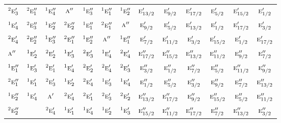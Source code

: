 \documentclass[10pt,a4paper]{article}
\numberwithin{equation}{section}
\newcommand{\irr}[1]{\text{\normalfont\scshape #1}}
\newcommand{\conjpair}[1]{{}^{#1}}
\begin{document}
{\begin{longtable}{@{}lcccccccccccc@{}}
$\conjpair{2}\irr{e}_{3}'$ & $\conjpair{2}\irr{e}_{1}''$ & $\conjpair{1}\irr{e}_{4}''$ & $\irr{a}''$ & $\conjpair{1}\irr{e}_{3}''$ & $\conjpair{1}\irr{e}_{1}''$ & $\conjpair{1}\irr{e}_{2}''$ & $\irr{e}_{13/2}'$ & $\irr{e}_{9/2}'$ & $\irr{e}_{17/2}'$ & $\irr{e}_{5/2}'$ & $\irr{e}_{15/2}'$ & $\irr{e}_{1/2}'$\\
$\conjpair{1}\irr{e}_{4}'$ & $\conjpair{2}\irr{e}_{3}''$ & $\conjpair{1}\irr{e}_{2}''$ & $\conjpair{2}\irr{e}_{2}''$ & $\conjpair{1}\irr{e}_{1}''$ & $\conjpair{2}\irr{e}_{1}''$ & $\irr{a}''$ & $\irr{e}_{9/2}'$ & $\irr{e}_{5/2}'$ & $\irr{e}_{13/2}'$ & $\irr{e}_{1/2}'$ & $\irr{e}_{17/2}'$ & $\irr{e}_{3/2}'$\\
$\conjpair{2}\irr{e}_{4}'$ & $\conjpair{2}\irr{e}_{2}''$ & $\conjpair{1}\irr{e}_{3}''$ & $\conjpair{2}\irr{e}_{1}''$ & $\conjpair{1}\irr{e}_{2}''$ & $\irr{a}''$ & $\conjpair{1}\irr{e}_{1}''$ & $\irr{e}_{7/2}'$ & $\irr{e}_{11/2}'$ & $\irr{e}_{3/2}'$ & $\irr{e}_{15/2}'$ & $\irr{e}_{1/2}'$ & $\irr{e}_{17/2}'$\\
$\irr{a}''$ & $\conjpair{1}\irr{e}_{2}'$ & $\conjpair{2}\irr{e}_{2}'$ & $\conjpair{1}\irr{e}_{3}'$ & $\conjpair{2}\irr{e}_{3}'$ & $\conjpair{1}\irr{e}_{4}'$ & $\conjpair{2}\irr{e}_{4}'$ & $\irr{e}_{17/2}''$ & $\irr{e}_{15/2}''$ & $\irr{e}_{13/2}''$ & $\irr{e}_{11/2}''$ & $\irr{e}_{9/2}''$ & $\irr{e}_{7/2}''$\\
$\conjpair{1}\irr{e}_{1}''$ & $\conjpair{1}\irr{e}_{3}'$ & $\conjpair{2}\irr{e}_{1}'$ & $\conjpair{1}\irr{e}_{4}'$ & $\conjpair{2}\irr{e}_{2}'$ & $\conjpair{2}\irr{e}_{4}'$ & $\conjpair{2}\irr{e}_{3}'$ & $\irr{e}_{3/2}''$ & $\irr{e}_{1/2}''$ & $\irr{e}_{7/2}''$ & $\irr{e}_{5/2}''$ & $\irr{e}_{11/2}''$ & $\irr{e}_{9/2}''$\\
$\conjpair{2}\irr{e}_{1}''$ & $\conjpair{1}\irr{e}_{1}'$ & $\conjpair{2}\irr{e}_{3}'$ & $\conjpair{1}\irr{e}_{2}'$ & $\conjpair{2}\irr{e}_{4}'$ & $\conjpair{1}\irr{e}_{3}'$ & $\conjpair{1}\irr{e}_{4}'$ & $\irr{e}_{1/2}''$ & $\irr{e}_{5/2}''$ & $\irr{e}_{3/2}''$ & $\irr{e}_{9/2}''$ & $\irr{e}_{7/2}''$ & $\irr{e}_{13/2}''$\\
$\conjpair{1}\irr{e}_{2}''$ & $\conjpair{1}\irr{e}_{4}'$ & $\irr{a}'$ & $\conjpair{2}\irr{e}_{4}'$ & $\conjpair{2}\irr{e}_{1}'$ & $\conjpair{2}\irr{e}_{3}'$ & $\conjpair{2}\irr{e}_{2}'$ & $\irr{e}_{13/2}''$ & $\irr{e}_{17/2}''$ & $\irr{e}_{9/2}''$ & $\irr{e}_{15/2}''$ & $\irr{e}_{5/2}''$ & $\irr{e}_{11/2}''$\\
$\conjpair{2}\irr{e}_{2}''$ &  & $\conjpair{2}\irr{e}_{4}'$ & $\conjpair{1}\irr{e}_{1}'$ & $\conjpair{1}\irr{e}_{4}'$ & $\conjpair{1}\irr{e}_{2}'$ & $\conjpair{1}\irr{e}_{3}'$ & $\irr{e}_{15/2}''$ & $\irr{e}_{11/2}''$ & $\irr{e}_{17/2}''$ & $\irr{e}_{7/2}''$ & $\irr{e}_{13/2}''$ & $\irr{e}_{3/2}''$\\

\end{longtable}}
\end{document}
